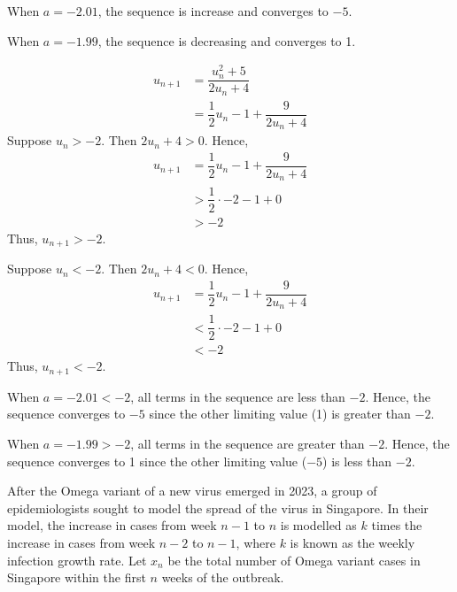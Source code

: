 \documentclass{echw}
\begin{document}
{                 When $a = -2.01$, the sequence is increase and converges to $-5$. 
                
                 When $a = -1.99$, the sequence is decreasing and converges to 1.

            \subpart
                \begin{align*}
                    u_{n+1} &= \dfrac{u_n^2 + 5}{2u_n + 4}\\
                    &= \dfrac12 u_n - 1 + \dfrac9{2u_n + 4}
                \end{align*}
                Suppose $u_n > -2$. Then $2u_n + 4 > 0$. Hence,
                \begin{align*}
                    u_{n+1} &= \dfrac12 u_n - 1 + \dfrac9{2u_n + 4}\\
                    &> \dfrac12 \cdot -2 - 1 + 0\\
                    &> -2
                \end{align*}
                Thus, $u_{n+1} > -2$.

                \medskip

                 Suppose $u_n < -2$. Then $2u_n + 4 < 0$. Hence,
                \begin{align*}
                    u_{n+1} &= \dfrac12 u_n - 1 + \dfrac9{2u_n + 4}\\
                    &< \dfrac12 \cdot -2 - 1 + 0\\
                    &< -2
                \end{align*}
                Thus, $u_{n+1} < -2$.

                \medskip

                 When $a = -2.01 < -2$, all terms in the sequence are less than $-2$. Hence, the sequence converges to $-5$ since the other limiting value (1) is greater than $-2$.

                 When $a = -1.99 > -2$, all terms in the sequence are greater than $-2$. Hence, the sequence converges to 1 since the other limiting value ($-5$) is less than $-2$.

    \problem{}
        After the Omega variant of a new virus emerged in 2023, a group of epidemiologists sought to model the spread of the virus in Singapore. In their model, the increase in cases from week $n-1$ to $n$ is modelled as $k$ times the increase in cases from week $n-2$ to $n-1$, where $k$ is known as the weekly infection growth rate. Let $x_n$ be the total number of Omega variant cases in Singapore within the first $n$ weeks of the outbreak.

}
\end{document}
